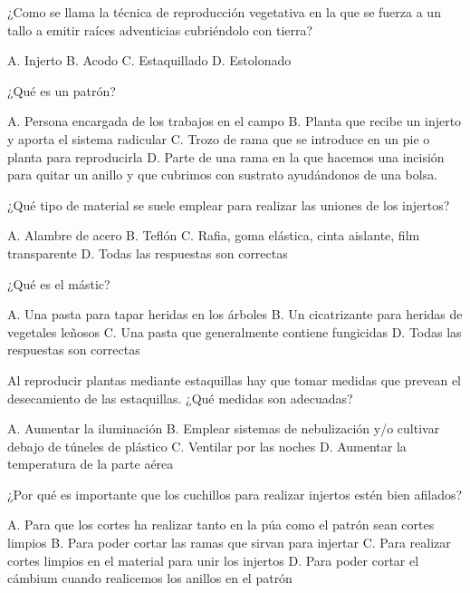 \documentclass[11pt]{exam}
\begin{document}
{\begin{questions}
\question ¿Como se llama la técnica de reproducción vegetativa en la que se
  fuerza a un tallo a emitir raíces adventicias cubriéndolo con tierra?
  \begin{checkboxes}
    \choice A. Injerto
    \CorrectChoice B. Acodo
    \choice C. Estaquillado
    \choice D. Estolonado
  \end{checkboxes}
\question ¿Qué es un patrón?
  \begin{checkboxes}
  \choice A. Persona encargada de los trabajos en el campo
  \CorrectChoice  B. Planta que recibe un injerto y aporta el sistema radicular
  \choice C. Trozo de rama que se introduce en un pie o planta para reproducirla
  \choice D. Parte de una rama en la que hacemos una incisión para quitar un
  anillo y que cubrimos con sustrato ayudándonos de una bolsa.
  \end{checkboxes}
\question ¿Qué tipo de material se suele emplear para realizar las uniones de los
  injertos?
  \begin{checkboxes}
    \choice A. Alambre de acero
    \choice B. Teflón
    \CorrectChoice C. Rafia, goma elástica, cinta aislante, film transparente
    \choice D. Todas las respuestas son correctas 
  \end{checkboxes}
\question ¿Qué es el mástic?
  \begin{checkboxes}
    \choice A. Una pasta para tapar heridas en los árboles
    \choice B. Un cicatrizante para heridas de vegetales leñosos
    \choice C. Una pasta que generalmente contiene fungicidas
    \CorrectChoice D. Todas las respuestas son correctas 
  \end{checkboxes}
\question Al reproducir plantas mediante estaquillas hay que tomar medidas que prevean el
  desecamiento de las estaquillas. ¿Qué medidas son adecuadas?
  \begin{checkboxes}
    \choice A. Aumentar la iluminación
    \CorrectChoice B. Emplear sistemas de nebulización y/o cultivar debajo de túneles de
    plástico
    \choice C. Ventilar por las noches
    \choice D. Aumentar la  temperatura de la parte aérea
  \end{checkboxes}
\question ¿Por qué es importante que los cuchillos para realizar injertos estén bien
  afilados?
  \begin{checkboxes}
    \CorrectChoice A. Para que los cortes ha realizar tanto en la púa como el patrón sean
    cortes limpios
    \choice B. Para poder cortar las ramas que sirvan para injertar
    \choice C. Para realizar cortes limpios en el material para unir los injertos
    \choice D. Para poder cortar el cámbium  cuando realicemos los anillos en el patrón
  \end{checkboxes}
\end{questions}
}
\end{document}
